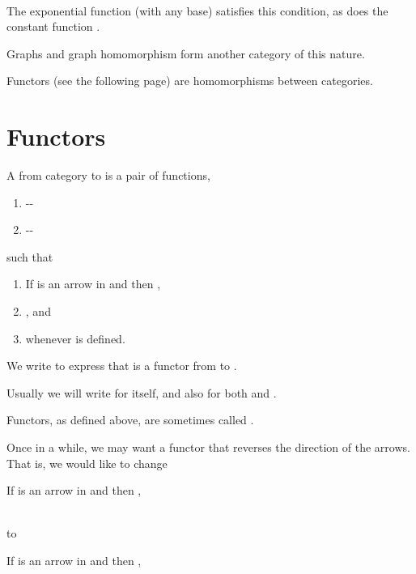 \documentclass{seminar}
\newcommand{\vs}{\vspace{0.3in}}
\begin{document}
\begin{slide}
\begin{codenott}
\\
\end{codenott}

The exponential function (with any base) satisfies this condition,
as does the constant function .

\newslide

Graphs and graph homomorphism form another category of this nature.

\vs

Functors (see the following page) are homomorphisms between categories.

\newslide

\section*{Functors}

A   from category  to 
is a pair of functions,
\begin{enumerate}
\item {}--
\item {}--
\end{enumerate}
such that
\begin{enumerate}
\item If  is an arrow in  and 
then ,
\item {}, and
\item {} whenever 
is defined.
\end{enumerate}

\newslide

We write  to express that
 is a functor from  to .

\vs

Usually we will write  for  itself,
and also for both  and .
\newslide

Functors, as defined above, are sometimes called .

\vs

Once in a while, we may want a functor that reverses the direction
of the arrows.  That is, we would like to change\\
\begin{codenott}[black]
If  is an arrow in  and 
then ,
\end{codenott}\\
to\\
\begin{codenott}[black]
If  is an arrow in  and 
then ,
\end{codenott}


\end{slide}
\end{document}
